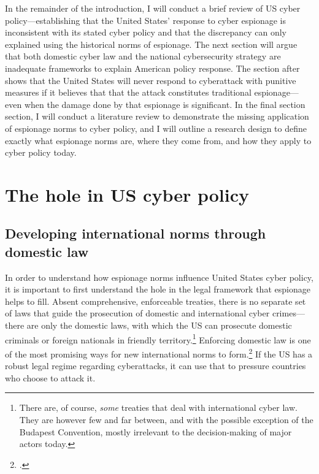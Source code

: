 \documentclass{memoir}
\begin{document}
\begin{refsegment}
In the remainder of the introduction, I will conduct a brief review of US cyber policy---establishing that the United States' response to cyber espionage is inconsistent with its stated cyber policy and that the discrepancy can only explained using the historical norms of espionage. The next section will argue that both domestic cyber law and the national cybersecurity strategy are inadequate frameworks to explain American policy response. The section after shows that the United States will never respond to cyberattack with punitive measures if it believes that that the attack constitutes traditional espionage---even when the damage done by that espionage is significant. In the final section section, I will conduct a literature review to demonstrate the missing application of espionage norms to cyber policy, and I will outline a research design to define exactly what espionage norms are, where they come from, and how they apply to cyber policy today.

\section{The hole in US cyber policy}
\subsection{Developing international norms through domestic law}
In order to understand how espionage norms influence United States cyber policy, it is important to first understand the hole in the legal framework that espionage helps to fill. Absent comprehensive, enforceable treaties, there is no separate set of laws that guide the prosecution of domestic and international cyber crimes---there are only the domestic laws, with which the US can prosecute domestic criminals or foreign nationals in friendly territory.\footnote{There are, of course, \emph{some} treaties that deal with international cyber law. They are however few and far between, and with the possible exception of the Budapest Convention, mostly irrelevant to the decision-making of major actors today.} Enforcing domestic law is one of the most promising ways for new international norms to form.\footcite[p.~295]{deeks_international_2015} If the US has a robust legal regime regarding cyberattacks, it can use that to pressure countries who choose to attack it.


\end{refsegment}
\end{document}
